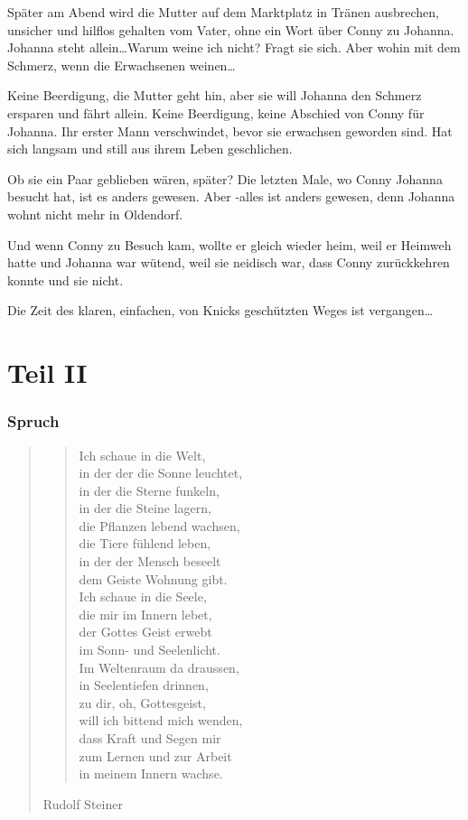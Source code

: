 \documentclass[10pt,titlepage,a5paper]{book}
\newenvironment{tg}{\begin{quote}\em}{\end{quote}}
\newenvironment{dichter}{\begin{flushright}}{\end{flushright}}
\begin{document}
Später am Abend wird die Mutter auf dem Marktplatz in Tränen ausbrechen, unsicher und hilflos gehalten vom Vater, ohne ein Wort über Conny zu Johanna. Johanna steht allein\dots Warum weine ich nicht? Fragt sie sich.
Aber wohin mit  dem Schmerz, wenn die Erwachsenen weinen\dots

Keine Beerdigung, die Mutter geht hin, aber sie will Johanna den Schmerz ersparen und fährt allein. Keine Beerdigung, keine Abschied von Conny für Johanna. Ihr erster Mann verschwindet, bevor sie erwachsen geworden sind. Hat sich langsam und still aus ihrem Leben geschlichen. 

Ob sie ein Paar geblieben wären, später? Die letzten Male, wo Conny Johanna besucht hat, ist es anders gewesen. Aber -alles ist anders gewesen, denn Johanna wohnt nicht mehr in Oldendorf. 

Und wenn Conny zu Besuch kam, wollte er gleich wieder heim, weil er Heimweh hatte und Johanna war wütend, weil sie neidisch war, dass Conny zurückkehren konnte und sie nicht. 

Die Zeit des klaren, einfachen, von Knicks geschützten Weges ist vergangen\dots


\part*{Teil II}


\section*{Spruch}


\begin{tg}
\begin{verse}
Ich schaue in die Welt,\\
in der der die Sonne leuchtet,\\
in der die Sterne funkeln,\\
in der die Steine lagern,\\
die Pflanzen lebend wachsen, \\
die Tiere fühlend leben, \\
in der der Mensch beseelt\\
dem Geiste Wohnung gibt.\\
Ich schaue in die Seele,\\
 die mir im Innern lebet, \\
der Gottes Geist erwebt\\
im Sonn- und Seelenlicht.\\
Im Weltenraum da draussen,\\
in Seelentiefen drinnen, \\
zu dir, oh, Gottesgeist,\\
will ich bittend mich wenden,\\
dass Kraft und Segen mir\\
zum Lernen und zur Arbeit\\
in meinem Innern wachse.  
\end{verse}
\begin{dichter}Rudolf Steiner\end{dichter}
\end{tg}
\end{document}
